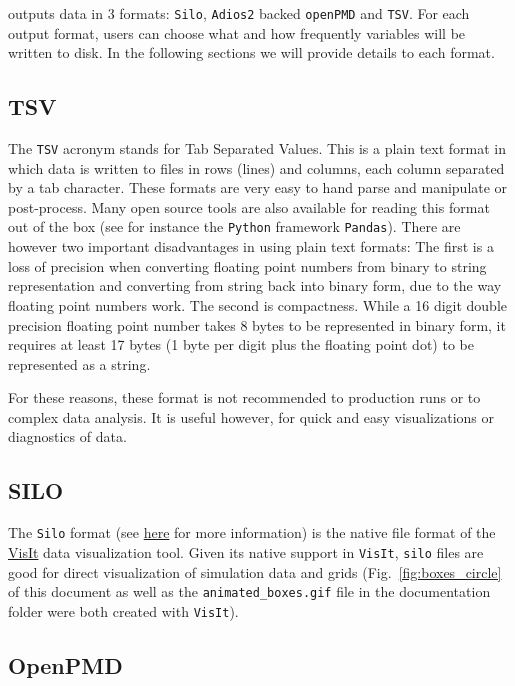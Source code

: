 \CarpetX\space outputs data in 3 formats: \texttt{Silo}, \texttt{Adios2} backed \texttt{openPMD} and \texttt{TSV}. For each output format, users can choose what and how frequently variables will be written to disk. In the following sections we will provide details to each format.

\subsection{TSV}
\label{sec:tsv}

The \texttt{TSV} acronym stands for Tab Separated Values. This is a plain text format in which data is written to files in rows (lines) and columns, each column separated by a tab character. These formats are very easy to hand parse and manipulate or post-process. Many open source tools are also available for reading this format out of the box (see for instance the \texttt{Python} framework \texttt{Pandas}). There are however two important disadvantages in using plain text formats: The first is a loss of precision when converting floating point numbers from binary to string representation and converting from string back into binary form, due to the way floating point numbers work. The second is compactness. While a 16 digit double precision floating point number takes 8 bytes to be represented in binary form, it requires at least 17 bytes (1 byte per digit plus the floating point dot) to be represented as a string.

For these reasons, these format is not recommended to production runs or to complex data analysis. It is useful however, for quick and easy visualizations or diagnostics of data.


\subsection{SILO}
\label{sec:silo}

The \texttt{Silo} format (see \href{https://visit-sphinx-github-user-manual.readthedocs.io/en/develop/data_into_visit/SiloFormat.html}{here} for more information) is the native file format of the \href{https://sd.llnl.gov/simulation/computer-codes/visit}{VisIt} data visualization tool. Given its native support in \texttt{VisIt}, \texttt{silo} files are good for direct visualization of simulation data and grids (Fig.~\ref{fig:boxes_circle} of this document as well as the \texttt{animated\_boxes.gif} file in the documentation folder were both created with \texttt{VisIt}).



\subsection{OpenPMD}
\label{sec:openpmd}

